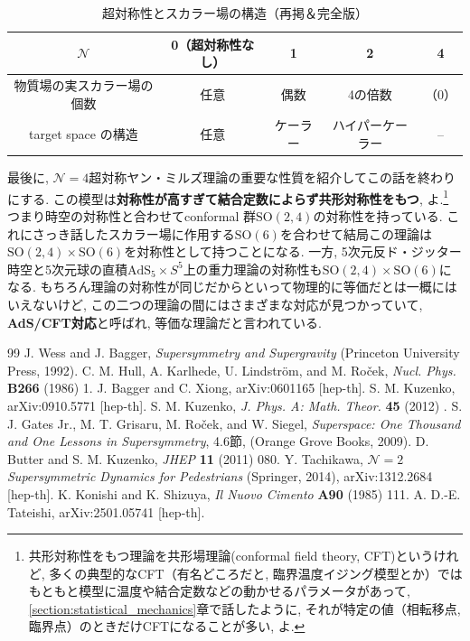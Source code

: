 \documentclass{ltjsarticle}
\theoremstyle{definition}
\begin{document}
\begin{table}
  \centering
  \caption{超対称性とスカラー場の構造（再掲＆完全版）}
  \label{tab:susy_scalar_structure_incomplete}
  \begin{tabular}{c|cccc}
    \hline\hline
   $\mathcal N$&0（超対称性なし）&1&2&4 \\
   \hline\hline
   物質場の実スカラー場の個数&任意&偶数&4の倍数&（0）\\
   \hline
   target space の構造&任意&ケーラー&ハイパーケーラー&--\\
   \hline\hline
\end{tabular}
\end{table}
\par
最後に, $\mathcal N=4$超対称ヤン・ミルズ理論の重要な性質を紹介してこの話を終わりにする. この模型は\textbf{対称性が高すぎて結合定数によらず共形対称性をもつ}, よ.\footnote{共形対称性をもつ理論を共形場理論(conformal field theory, CFT)というけれど, 多くの典型的なCFT（有名どころだと, 臨界温度イジング模型とか）ではもともと模型に温度や結合定数などの動かせるパラメータがあって, \ref{section:statistical_mechanics}章で話したように, それが特定の値（相転移点, 臨界点）のときだけCFTになることが多い, よ.} つまり時空の対称性と合わせてconformal 群$\mathrm{SO}(2,4)$の対称性を持っている. これにさっき話したスカラー場に作用する$\mathrm{SO}(6)$を合わせて結局この理論は$\mathrm{SO}(2,4)\times\mathrm{SO}(6)$を対称性として持つことになる. 一方, 5次元反ド・ジッター時空と5次元球の直積$\mathrm{AdS}_5\times S^5$上の重力理論の対称性も$\mathrm{SO}(2,4)\times\mathrm{SO}(6)$になる. もちろん理論の対称性が同じだからといって物理的に等価だとは一概にはいえないけど, この二つの理論の間にはさまざまな対応が見つかっていて, \textbf{AdS/CFT対応}と呼ばれ, 等価な理論だと言われている.

\begin{thebibliography}{99}
\bibitem{} J. Wess and J. Bagger, {\it Supersymmetry and Supergravity} (Princeton University Press, 1992).
\bibitem{} C. M. Hull, A. Karlhede, U. Lindstr\"om, and M. Ro\v cek, {\it Nucl. Phys.} \textbf{B266} (1986) 1.
\bibitem{} J. Bagger and C. Xiong, arXiv:0601165 [hep-th].
\bibitem{} S. M. Kuzenko, arXiv:0910.5771 [hep-th].
\bibitem{} S. M. Kuzenko, {\it J. Phys. A: Math. Theor.} \textbf{45} (2012) .
\bibitem{} S. J. Gates Jr., M. T. Grisaru, M. Ro\v cek, and W. Siegel, {\it Superspace: One Thousand and One Lessons in Supersymmetry}, 4.6節, (Orange Grove Books, 2009).
\bibitem{} D. Butter and S. M. Kuzenko, {\it JHEP} \textbf{11} (2011) 080.
\bibitem{} Y. Tachikawa, {\it $\mathcal N=2$ Supersymmetric Dynamics for Pedestrians} (Springer, 2014), arXiv:1312.2684 [hep-th].
\bibitem{} K. Konishi and K. Shizuya, {\it Il Nuovo Cimento} \textbf{A90} (1985) 111.
\bibitem{} A. D.-E. Tateishi, arXiv:2501.05741 [hep-th].
\end{thebibliography}
\end{document}
